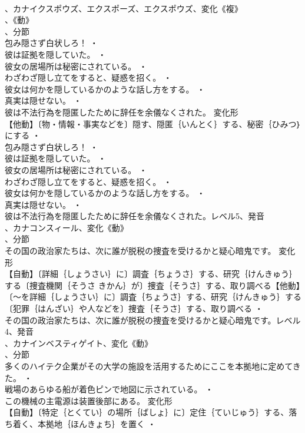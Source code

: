 \documentclass[8pt]{extreport}
\begin{document}
\begin{CJK}{UTF8}{min}
\\	、カナイクスポウズ、エクスポーズ、エクスポウズ、変化《複》
\\	、《動》
\\	、分節
\\	包み隠さず白状しろ！ ・
\\	彼は証拠を隠していた。 ・
\\	彼女の居場所は秘密にされている。 ・
\\	わざわざ隠し立てをすると、疑惑を招く。 ・
\\	彼女は何かを隠しているかのような話し方をする。 ・
\\	真実は隠せない。 ・
\\	彼は不法行為を隠匿したために辞任を余儀なくされた。	変化形 
\\	【他動】〔物・情報・事実などを〕隠す、隠匿｛いんとく｝する、秘密｛ひみつ｝にする ・
\\	包み隠さず白状しろ！ ・
\\	彼は証拠を隠していた。 ・
\\	彼女の居場所は秘密にされている。 ・
\\	わざわざ隠し立てをすると、疑惑を招く。 ・
\\	彼女は何かを隠しているかのような話し方をする。 ・
\\	真実は隠せない。 ・
\\	彼は不法行為を隠匿したために辞任を余儀なくされた。レベル5、発音
\\	、カナコンスィール、変化《動》
\\	、分節
\\	その国の政治家たちは、次に誰が脱税の捜査を受けるかと疑心暗鬼です。	変化形 
\\	【自動】〔詳細｛しょうさい｝に〕調査｛ちょうさ｝する、研究｛けんきゅう｝する〔捜査機関｛そうさ きかん｝が〕捜査｛そうさ｝する、取り調べる【他動】〔～を詳細｛しょうさい｝に〕調査｛ちょうさ｝する、研究｛けんきゅう｝する〔犯罪｛はんざい｝や人などを〕捜査｛そうさ｝する、取り調べる ・
\\	その国の政治家たちは、次に誰が脱税の捜査を受けるかと疑心暗鬼です。レベル4、発音
\\	、カナインベスティゲイト、変化《動》
\\	、分節
\\	多くのハイテク企業がその大学の施設を活用するためにここを本拠地に定めてきた。 ・
\\	戦場のあらゆる船が着色ピンで地図に示されている。 ・
\\	この機械の主電源は装置後部にある。	変化形 
\\	【自動】〔特定｛とくてい｝の場所｛ばしょ｝に〕定住｛ていじゅう｝する、落ち着く、本拠地｛ほんきょち｝を置く ・

\end{CJK}
\end{document}
